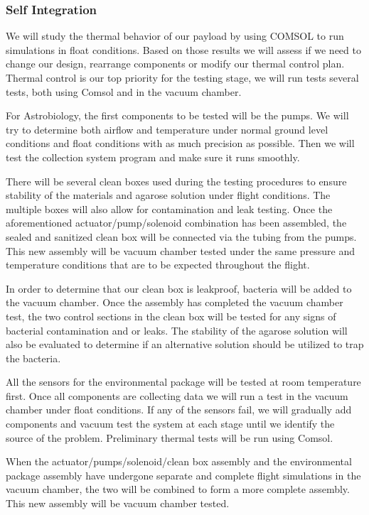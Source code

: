 \subsubsection{Self Integration}
We will study the thermal behavior of our payload by using COMSOL to run simulations in float conditions. Based on those results we will assess if we need to change our design, rearrange components or modify our thermal control plan. Thermal control is our top priority for the testing stage, we will run tests several tests, both using Comsol and in the vacuum chamber.

For Astrobiology, the first components to be tested will be the pumps. We will try to determine both airflow and temperature under normal ground level conditions and float conditions with as much precision as possible. Then we will test the collection system program and make sure it runs smoothly.  

There will be several clean boxes used during the testing procedures to ensure stability of the materials and agarose solution under flight conditions. The multiple boxes will also allow for contamination and leak testing. Once the aforementioned actuator/pump/solenoid combination has been assembled, the sealed and sanitized clean box will be connected via the tubing from the pumps. This new assembly will be vacuum chamber tested under the same pressure and temperature conditions that are to be expected throughout the flight. 

In order to determine that our clean box is leakproof, bacteria will be added to the vacuum chamber. Once the assembly has completed the vacuum chamber test, the two control sections in the clean box will be tested for any signs of bacterial contamination and or leaks. The stability of the agarose solution will also be evaluated to determine if an alternative solution should be utilized to trap the bacteria. 

All the sensors for the environmental package will be tested at room temperature first. Once all components are collecting data we will run a test in the vacuum chamber under float conditions. If any of the sensors fail, we will gradually add components and vacuum test the system at each stage until we identify the source of the problem. Preliminary thermal tests will be run using Comsol. 

When the actuator/pumps/solenoid/clean box assembly and the environmental package assembly have undergone separate and complete flight simulations in the vacuum chamber, the two will be combined to form a more complete assembly. This new assembly will be vacuum chamber tested. 

